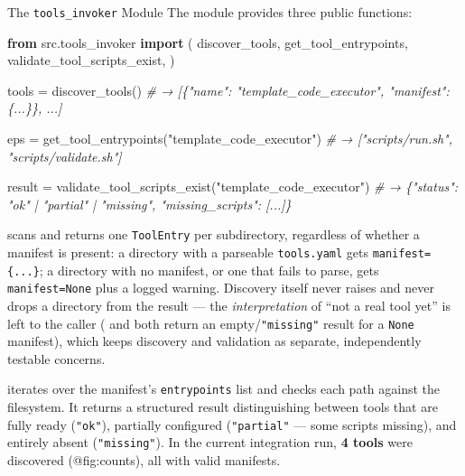 \documentclass[
  ignorenonframetext,
]{beamer}
\newenvironment{Shaded}{}{}
\newcommand{\CommentTok}[1]{\textcolor[rgb]{0.38,0.63,0.69}{\textit{#1}}}
\newcommand{\ImportTok}[1]{\textcolor[rgb]{0.00,0.50,0.00}{\textbf{#1}}}
\newcommand{\NormalTok}[1]{#1}
\newcommand{\OperatorTok}[1]{\textcolor[rgb]{0.40,0.40,0.40}{#1}}
\newcommand{\StringTok}[1]{\textcolor[rgb]{0.25,0.44,0.63}{#1}}
\begin{document}
\begin{frame}{The \texttt{tools\_invoker}
Module}
\protect{}\label{the-tools_invoker-module}
The  module provides three public
functions:

\begin{Shaded}
\begin{Highlighting}[]
\ImportTok{from}\NormalTok{ src.tools\_invoker }\ImportTok{import}\NormalTok{ (}
\NormalTok{    discover\_tools,}
\NormalTok{    get\_tool\_entrypoints,}
\NormalTok{    validate\_tool\_scripts\_exist,}
\NormalTok{)}

\NormalTok{tools }\OperatorTok{=}\NormalTok{ discover\_tools()}
\CommentTok{\# → [\{"name": "template\_code\_executor", "manifest": \{...\}\}, ...]}

\NormalTok{eps }\OperatorTok{=}\NormalTok{ get\_tool\_entrypoints(}\StringTok{"template\_code\_executor"}\NormalTok{)}
\CommentTok{\# → ["scripts/run.sh", "scripts/validate.sh"]}

\NormalTok{result }\OperatorTok{=}\NormalTok{ validate\_tool\_scripts\_exist(}\StringTok{"template\_code\_executor"}\NormalTok{)}
\CommentTok{\# → \{"status": "ok" | "partial" | "missing", "missing\_scripts": [...]\}}
\end{Highlighting}
\end{Shaded}

 scans  and returns
one \texttt{ToolEntry} per subdirectory, regardless of whether a
manifest is present: a directory with a parseable \texttt{tools.yaml}
gets \texttt{manifest=\{...\}}; a directory with no manifest, or one
that fails to parse, gets \texttt{manifest=None} plus a logged warning.
Discovery itself never raises and never drops a directory from the
result --- the \emph{interpretation} of ``not a real tool yet'' is left
to the caller ( and
 both return an
empty/\texttt{"missing"} result for a \texttt{None} manifest), which
keeps discovery and validation as separate, independently testable
concerns.

 iterates over the manifest's
\texttt{entrypoints} list and checks each path against the filesystem.
It returns a structured result distinguishing between tools that are
fully ready (\texttt{"ok"}), partially configured (\texttt{"partial"}
--- some scripts missing), and entirely absent (\texttt{"missing"}). In
the current integration run, \textbf{4 tools} were discovered
(@fig:counts), all with valid manifests.
\end{frame}
\end{document}
